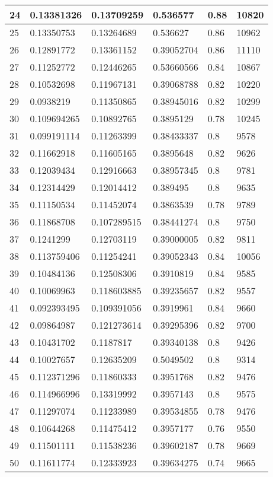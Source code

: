 \begin{longtable}{|l|l|l|l|l|l|}
24 & 0.13381326 & 0.13709259 & 0.536577 & 0.88 & 10820 \\ \hline 
25 & 0.13350753 & 0.13264689 & 0.536627 & 0.86 & 10962 \\ \hline 
26 & 0.12891772 & 0.13361152 & 0.39052704 & 0.86 & 11110 \\ \hline 
27 & 0.11252772 & 0.12446265 & 0.53660566 & 0.84 & 10867 \\ \hline 
28 & 0.10532698 & 0.11967131 & 0.39068788 & 0.82 & 10220 \\ \hline 
29 & 0.0938219 & 0.11350865 & 0.38945016 & 0.82 & 10299 \\ \hline 
30 & 0.109694265 & 0.10892765 & 0.3895129 & 0.78 & 10245 \\ \hline 
31 & 0.099191114 & 0.11263399 & 0.38433337 & 0.8 & 9578 \\ \hline 
32 & 0.11662918 & 0.11605165 & 0.3895648 & 0.82 & 9626 \\ \hline 
33 & 0.12039434 & 0.12916663 & 0.38957345 & 0.8 & 9781 \\ \hline 
34 & 0.12314429 & 0.12014412 & 0.389495 & 0.8 & 9635 \\ \hline 
35 & 0.11150534 & 0.11452074 & 0.3863539 & 0.78 & 9789 \\ \hline 
36 & 0.11868708 & 0.107289515 & 0.38441274 & 0.8 & 9750 \\ \hline 
37 & 0.1241299 & 0.12703119 & 0.39000005 & 0.82 & 9811 \\ \hline 
38 & 0.113759406 & 0.11254241 & 0.39052343 & 0.84 & 10056 \\ \hline 
39 & 0.10484136 & 0.12508306 & 0.3910819 & 0.84 & 9585 \\ \hline 
40 & 0.10069963 & 0.118603885 & 0.39235657 & 0.82 & 9557 \\ \hline 
41 & 0.092393495 & 0.109391056 & 0.3919961 & 0.84 & 9660 \\ \hline 
42 & 0.09864987 & 0.121273614 & 0.39295396 & 0.82 & 9700 \\ \hline 
43 & 0.10431702 & 0.1187817 & 0.39340138 & 0.8 & 9426 \\ \hline 
44 & 0.10027657 & 0.12635209 & 0.5049502 & 0.8 & 9314 \\ \hline 
45 & 0.112371296 & 0.11860333 & 0.3951768 & 0.82 & 9476 \\ \hline 
46 & 0.114966996 & 0.13319992 & 0.3957143 & 0.8 & 9575 \\ \hline 
47 & 0.11297074 & 0.11233989 & 0.39534855 & 0.78 & 9476 \\ \hline 
48 & 0.10644268 & 0.11475412 & 0.3957177 & 0.76 & 9550 \\ \hline 
49 & 0.11501111 & 0.11538236 & 0.39602187 & 0.78 & 9669 \\ \hline 
50 & 0.11611774 & 0.12333923 & 0.39634275 & 0.74 & 9665 \\ \hline 
\end{longtable}